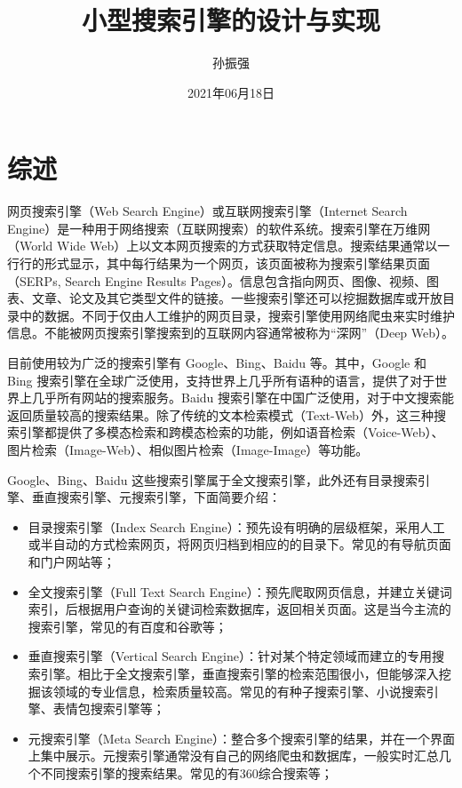 \documentclass{ctexart}
\title{小型搜索引擎的设计与实现}
\author{孙振强}
\date{2021年06月18日}
\begin{document}
    \maketitle
    \newpage

    \tableofcontents
    \newpage


    \section{综述}\label{sec:introduction}

    网页搜索引擎（Web Search Engine）或互联网搜索引擎（Internet Search Engine）是一种用于网络搜索（互联网搜索）的软件系统。搜索引擎在万维网（World Wide Web）上以文本网页搜索的方式获取特定信息。搜索结果通常以一行行的形式显示，其中每行结果为一个网页，该页面被称为搜索引擎结果页面（SERPs, Search Engine Results Pages）。信息包含指向网页、图像、视频、图表、文章、论文及其它类型文件的链接。一些搜索引擎还可以挖掘数据库或开放目录中的数据。不同于仅由人工维护的网页目录，搜索引擎使用网络爬虫来实时维护信息。不能被网页搜索引擎搜索到的互联网内容通常被称为“深网”（Deep Web）\cite{wikipedia-search-engine}。

    目前使用较为广泛的搜索引擎有 Google、Bing、Baidu 等。其中，Google 和 Bing 搜索引擎在全球广泛使用，支持世界上几乎所有语种的语言，提供了对于世界上几乎所有网站的搜索服务。Baidu 搜索引擎在中国广泛使用，对于中文搜索能返回质量较高的搜索结果。除了传统的文本检索模式（Text-Web）外，这三种搜索引擎都提供了多模态检索和跨模态检索的功能，例如语音检索（Voice-Web）、图片检索（Image-Web）、相似图片检索（Image-Image）等功能。

    Google、Bing、Baidu 这些搜索引擎属于全文搜索引擎，此外还有目录搜索引擎、垂直搜索引擎、元搜索引擎\cite{baike-search-engine}，下面简要介绍：

    \begin{itemize}
        \item 目录搜索引擎（Index Search Engine）：预先设有明确的层级框架，采用人工或半自动的方式检索网页，将网页归档到相应的的目录下。常见的有导航页面和门户网站等；
        \item 全文搜索引擎（Full Text Search Engine）：预先爬取网页信息，并建立关键词索引，后根据用户查询的关键词检索数据库，返回相关页面。这是当今主流的搜索引擎，常见的有百度和谷歌等；
        \item 垂直搜索引擎（Vertical Search Engine）：针对某个特定领域而建立的专用搜索引擎。相比于全文搜索引擎，垂直搜索引擎的检索范围很小，但能够深入挖掘该领域的专业信息，检索质量较高。常见的有种子搜索引擎、小说搜索引擎、表情包搜索引擎等；
        \item 元搜索引擎（Meta Search Engine）：整合多个搜索引擎的结果，并在一个界面上集中展示。元搜索引擎通常没有自己的网络爬虫和数据库，一般实时汇总几个不同搜索引擎的搜索结果。常见的有360综合搜索等；
    \end{itemize}
\end{document}
